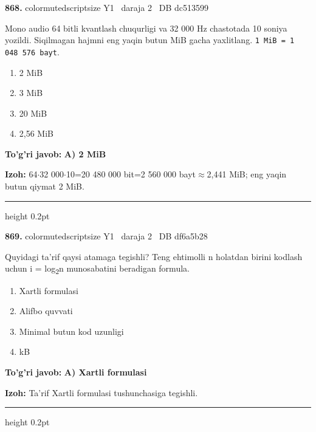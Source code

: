 \documentclass[10pt,a4paper,oneside]{article}
\begin{document}
\noindent\textbf{\color{ink}868.}  {color{muted}scriptsize Y1 \textbullet\ daraja 2 \textbullet\ DB dc513599}
\par
Mono audio 64 bitli kvantlash chuqurligi va 32 000 Hz chastotada 10 soniya yozildi. Siqilmagan hajmni eng yaqin butun MiB gacha yaxlitlang. \texttt{1 MiB = 1 048 576 bayt}.
\begin{enumerate}[label=\Alph*),leftmargin=9mm]
\item 2 MiB
\item 3 MiB
\item 20 MiB
\item 2,56 MiB
\end{enumerate}
\begin{tcolorbox}[enhanced,breakable,colback=teal!4,colframe=teal!50!black,boxrule=0.5pt,arc=1.1mm,left=3mm,right=3mm,top=1.7mm,bottom=1.7mm,before skip=2mm,after skip=2mm]
\textbf{\color{teal}To'g'ri javob:} \textbf{A) 2 MiB}
\par\smallskip
\textbf{Izoh:} 64\ensuremath{\cdot}32 000\ensuremath{\cdot}10=20 480 000 bit=2 560 000 bayt\ensuremath{\approx}2,441 MiB; eng yaqin butun qiymat 2 MiB.
\end{tcolorbox}
\vspace{2mm}\hrule height 0.2pt \vspace{3mm}

\noindent\textbf{\color{ink}869.}  {color{muted}scriptsize Y1 \textbullet\ daraja 2 \textbullet\ DB df6a5b28}
\par
Quyidagi ta'rif qaysi atamaga tegishli? Teng ehtimolli n holatdan birini kodlash uchun i = log\textsubscript{2}n munosabatini beradigan formula.
\begin{enumerate}[label=\Alph*),leftmargin=9mm]
\item Xartli formulasi
\item Alifbo quvvati
\item Minimal butun kod uzunligi
\item kB
\end{enumerate}
\begin{tcolorbox}[enhanced,breakable,colback=teal!4,colframe=teal!50!black,boxrule=0.5pt,arc=1.1mm,left=3mm,right=3mm,top=1.7mm,bottom=1.7mm,before skip=2mm,after skip=2mm]
\textbf{\color{teal}To'g'ri javob:} \textbf{A) Xartli formulasi}
\par\smallskip
\textbf{Izoh:} Ta'rif Xartli formulasi tushunchasiga tegishli.
\end{tcolorbox}
\vspace{2mm}\hrule height 0.2pt \vspace{3mm}
\end{document}
